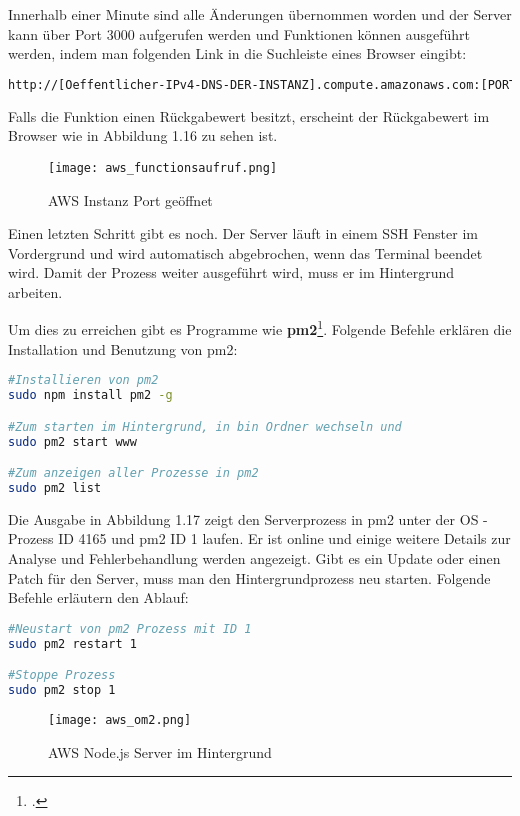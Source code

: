 Innerhalb einer Minute sind alle Änderungen übernommen worden und der Server kann über Port 3000 aufgerufen werden und Funktionen können ausgeführt werden, indem man folgenden Link
in die Suchleiste eines Browser eingibt:
\begin{lstlisting}[language=bash]
http://[Oeffentlicher-IPv4-DNS-DER-INSTANZ].compute.amazonaws.com:[PORTNUMMER]/[FUNKTIONS_NAME]
\end{lstlisting}
Falls die Funktion einen Rückgabewert besitzt, erscheint der Rückgabewert im Browser wie in Abbildung 1.16 zu sehen ist.
\begin{center}
\begin{figure}[H]
    \centering
    \texttt{[image: aws\_functionsaufruf.png]}
    \caption{AWS Instanz Port geöffnet}
\end{figure}
\end{center}
Einen letzten Schritt gibt es noch.
Der Server läuft in einem SSH Fenster im Vordergrund und wird automatisch abgebrochen, wenn das Terminal beendet wird.
Damit der Prozess weiter ausgeführt wird, muss er im Hintergrund arbeiten.

Um dies zu erreichen gibt es Programme wie \textbf{pm2}\footcite{pm2}. Folgende Befehle erklären die Installation und Benutzung von pm2:
\begin{lstlisting}[language=bash]
#Installieren von pm2
sudo npm install pm2 -g

#Zum starten im Hintergrund, in bin Ordner wechseln und
sudo pm2 start www

#Zum anzeigen aller Prozesse in pm2
sudo pm2 list
\end{lstlisting}
Die Ausgabe in Abbildung 1.17 zeigt den Serverprozess in pm2 unter der OS - Prozess ID 4165 und pm2 ID 1 laufen. Er ist online und einige weitere Details zur Analyse und Fehlerbehandlung werden angezeigt.
Gibt es ein Update oder einen Patch für den Server, muss man den Hintergrundprozess neu starten. Folgende Befehle erläutern den Ablauf:
\begin{lstlisting}[language=bash]
#Neustart von pm2 Prozess mit ID 1
sudo pm2 restart 1

#Stoppe Prozess
sudo pm2 stop 1
\end{lstlisting}
\begin{center}
\begin{figure}[H]
    \centering
    \texttt{[image: aws\_om2.png]}
    \caption{AWS Node.js Server im Hintergrund}
\end{figure}
\end{center}
\newpage